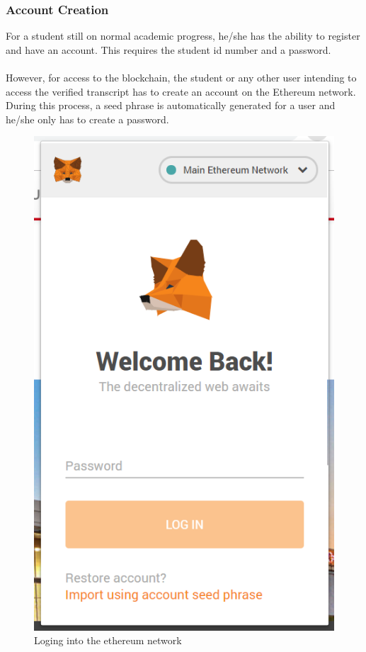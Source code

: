 \subsubsection{Account Creation}
For a student still on normal academic progress, he/she has the ability to register and have an account. This requires the student id number and a password. \\~\\
However, for access to the blockchain, the student or any other user intending to access the verified transcript has to create an account on the Ethereum\cite{art13} network. During this process, a seed phrase is automatically generated for a user and he/she only has to create a password.

\begin{figure}[!h]
\center
\includegraphics[scale=0.6]{images/metamasklogin.png}
\caption{Loging into the ethereum network}
\end{figure}

